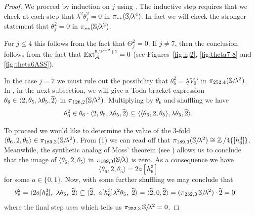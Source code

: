 \begin{proof}  
  We proceed by induction on $j$ using .
  The inductive step requires that we check at each step that $\lambda^2 \theta_j^2 = 0$ in $\pi_{**}(\operatorname{\mathbb{S}}\hspace{-2.2pt}/\!\lambda^4)$. In fact we will check the stronger statement that $\theta_j^2 = 0$ in $\pi_{**}(\operatorname{\mathbb{S}}\hspace{-2.2pt}/\!\lambda^2)$.

  For $j \leq 4$ this follows from the fact that $\Theta_j^2 = 0$.
  If $j \neq 7$, then the conclusion follows from the fact that $\operatorname{\mathrm{Ext}}_{\operatorname{\mathcal{A}}}^{5,2^{j+2} + 1} = 0$ (see Figures~\ref{fig:hj2}, \ref{fig:theta7-8} and \ref{fig:theta6ASS}).

  In the case $j=7$ we must rule out the possibility that $\theta_6^2 = \underline{\lambda} V_0'$ in $\pi_{252,4}(\operatorname{\mathbb{S}}\hspace{-2.2pt}/\!\lambda^2)$.
  In , in the next subsection, we will give a Toda bracket expression
  $ \theta_6 \in \langle 2, \theta_5, \lambda \theta_5, \wt{2} \rangle$ in $\pi_{126,2}(\operatorname{\mathbb{S}}\hspace{-2.2pt}/\!\lambda^2)$.
  Multiplying by $\theta_6$ and shuffling we have
  \[ \theta_6^2 \in \theta_6 \cdot \langle 2, \theta_5, \lambda \theta_5, \wt{2} \rangle \subseteq \langle \langle \theta_6, 2, \theta_5 \rangle, \lambda \theta_5, \wt{2} \rangle. \]
  
  To proceed we would like to determine the value of the 3-fold $\langle \theta_6, 2, \theta_5 \rangle \in \pi_{189,3}(\operatorname{\mathbb{S}}\hspace{-2.2pt}/\!\lambda^2)$.
  From (1) we can read off that $\pi_{189,3}(\operatorname{\mathbb{S}}\hspace{-2.2pt}/\!\lambda^2) \cong \operatorname{\mathbb{Z}}/4\{[h_6^3]\}$.
  Meanwhile, the synthetic analog of Moss' theorem (see \cite{cookware}) allows us to conclude that the image of $\langle \theta_6, 2, \theta_5 \rangle$ in $\pi_{189,3}(\operatorname{\mathbb{S}}\hspace{-2.2pt}/\!\lambda)$ is zero.
  As a consequence we have  
  \[ \langle \theta_6, 2, \theta_5 \rangle = 2a[h_6^3] \]
  for some $a \in \{0,1\}$.
  Now, with some further shuffling we may conclude that
  \begin{align*}
    \theta_6^2
    &= \langle 2a[h_6^3],\ \lambda \theta_5,\ \wt{2} \rangle 
      \subseteq \langle \wt{2},\ a[h_6^3] \lambda^2 \theta_5,\ \wt{2} \rangle = \langle \wt{2}, 0, \wt{2} \rangle
      = (\pi_{252,3}\clambda^2) \cdot \wt{2} = 0             
  \end{align*}
  where the final step uses  which tells us $\pi_{252,3}\operatorname{\mathbb{S}}\hspace{-2.2pt}/\!\lambda^2 = 0$.
  \qedhere
  

\end{proof}
